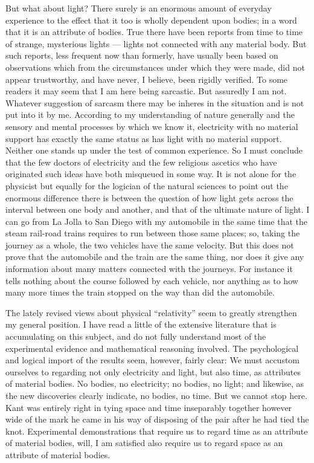 \documentclass[a4paper, 11pt, oneside, polutonikogreek, english]{article}
\begin{document}
But what about light? There surely is an enormous amount of everyday experience to the effect that it too is wholly dependent upon bodies; in a word that it is an attribute of bodies. True there have been reports from time to time of strange, mysterious lights --- lights not connected with any material body. But such reports, less frequent now than formerly, have usually been based on observations which from the circumstances under which they were made, did not appear trustworthy, and have never, I believe, been rigidly verified. To some readers it may seem that I am here being sarcastic. But assuredly I am not. Whatever suggestion of sarcasm there may be inheres in the situation and is not put into it by me. According to my understanding of nature generally and the sensory and mental processes by which we know it, electricity with no material support has exactly the same status as has light with no material support. Neither one stands up under the test of common experience. So I must conclude that the few doctors of electricity and the few religious ascetics who have originated such ideas have both misqueued in some way. It is not alone for the physicist but equally for the logician of the natural sciences to point out the enormous difference there is between the question of how light gets across the interval between one body and another, and that of the ultimate nature of light. I can go from La Jolla to San Diego with my automobile in the same time that the steam rail-road trains requires to run between those same places; so, taking the journey as a whole, the two vehicles have the same velocity. But this does not prove that the automobile and the train are the same thing, nor does it give any information about many matters connected with the journeys. For instance it tells nothing about the course followed by each vehicle, nor anything as to how many more times the train stopped on the way than did the automobile.

The lately revised views about physical ``relativity'' seem to greatly strengthen my general position. I have read a little of the extensive literature that is accumulating on this subject, and do not fully understand most of the experimental evidence and mathematical reasoning involved. The psychological and logical import of the results seem, however, fairly clear: We must accustom ourselves to regarding not only electricity and light, but also time, as attributes of material bodies. No bodies, no electricity; no bodies, no light; and likewise, as the new discoveries clearly indicate, no bodies, no time. But we cannot stop here. Kant was entirely right in tying space and time inseparably together however wide of the mark he came in his way of disposing of the pair after he had tied the knot. Experimental demonstrations that require us to regard time as an attribute of material bodies, will, I am satisfied also require us to regard space as an attribute of material bodies.
\end{document}
